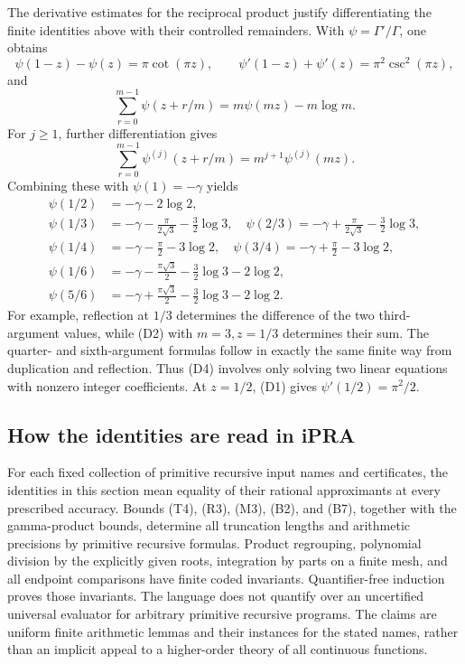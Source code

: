 The derivative estimates for the reciprocal product justify
differentiating the finite identities above with their controlled
remainders. With \(\psi=\Gamma'/\Gamma\), one obtains
\[
 \psi(1-z)-\psi(z)=\pi\cot(\pi z),\qquad
 \psi'(1-z)+\psi'(z)=\pi^2\csc^2(\pi z),                \tag{D1}
\]
and
\[
 \sum_{r=0}^{m-1}\psi(z+r/m)=m\psi(mz)-m\log m.         \tag{D2}
\]
For \(j\ge1\), further differentiation gives
\[
 \sum_{r=0}^{m-1}\psi^{(j)}(z+r/m)
                         =m^{j+1}\psi^{(j)}(mz).        \tag{D3}
\]
Combining these with \(\psi(1)=-\gamma\) yields
\[
 \begin{aligned}
 \psi(1/2)&=-\gamma-2\log2,\\
 \psi(1/3)&=-\gamma-\frac{\pi}{2\sqrt3}-\frac32\log3,\quad
 \psi(2/3)=-\gamma+\frac{\pi}{2\sqrt3}-\frac32\log3,\\
 \psi(1/4)&=-\gamma-\frac\pi2-3\log2,\quad
 \psi(3/4)=-\gamma+\frac\pi2-3\log2,\\
 \psi(1/6)&=-\gamma-\frac{\pi\sqrt3}{2}-\frac32\log3-2\log2,\\
 \psi(5/6)&=-\gamma+\frac{\pi\sqrt3}{2}-\frac32\log3-2\log2.
 \end{aligned}                                        \tag{D4}
\]
For example, reflection at \(1/3\) determines the difference of the
two third-argument values, while (D2) with \(m=3,z=1/3\) determines
their sum. The quarter- and sixth-argument formulas follow in exactly
the same finite way from duplication and reflection. Thus (D4) involves
only solving two linear equations with nonzero integer coefficients.
At \(z=1/2\), (D1) gives \(\psi'(1/2)=\pi^2/2\).

\subsection{How the identities are read in iPRA}

For each fixed collection of primitive recursive input names and
certificates, the identities in this section mean equality of their
rational approximants at every prescribed accuracy. Bounds (T4), (R3),
(M3), (B2), and (B7), together with the gamma-product bounds, determine
all truncation lengths and arithmetic precisions by primitive recursive
formulas. Product regrouping, polynomial division by the explicitly
given roots, integration by parts on a finite mesh, and all endpoint
comparisons have finite coded invariants. Quantifier-free induction
proves those invariants. The language does not quantify over an
uncertified universal evaluator for arbitrary primitive recursive
programs. The claims are uniform finite arithmetic lemmas and their
instances for the stated names, rather than an implicit appeal to a
higher-order theory of all continuous functions.

